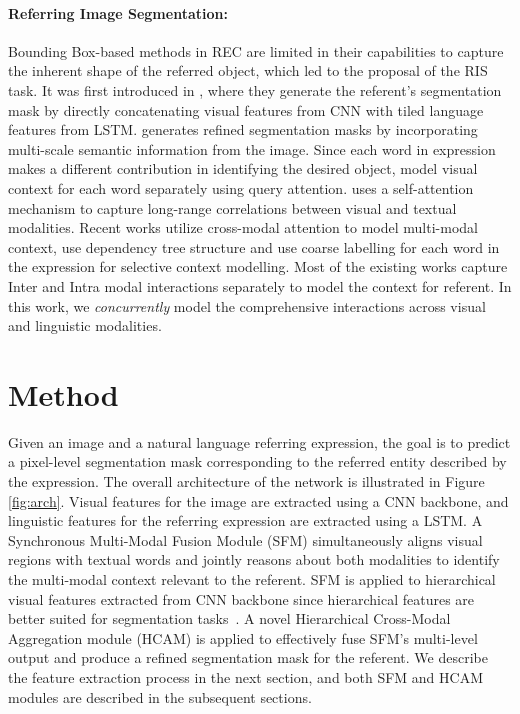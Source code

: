 \documentclass[11pt]{article}
\begin{document}
\paragraph{Referring Image Segmentation:} Bounding Box-based methods in REC are limited in their capabilities to capture the inherent shape of the referred object, which led to the proposal of the RIS task. It was first introduced in \cite{hu2016segmentation}, where they generate the referent's segmentation mask by directly concatenating visual features from CNN with tiled language features from LSTM. \cite{Li_2018_CVPR} generates refined segmentation masks by incorporating multi-scale semantic information from the image. Since each word in expression makes a different contribution in identifying the desired object, \cite{Shi_2018_ECCV} model visual context for each word separately using query attention. \cite{ye2019cross} uses a self-attention mechanism to capture long-range correlations between visual and textual modalities. Recent works \cite{Hu_2020_CVPR, Huang_2020_CVPR, hui2020linguistic} utilize cross-modal attention to model multi-modal context, \cite{hui2020linguistic, Yang_2021_CVPR} use dependency tree structure and \cite{Huang_2020_CVPR} use coarse labelling for each word in the expression for selective context modelling. Most of the existing works capture Inter and Intra modal interactions separately to model the context for referent. In this work, we \emph{concurrently} model the comprehensive interactions across visual and linguistic modalities.





\section{Method}
Given an image and a natural language referring expression, the goal is to predict a pixel-level segmentation mask corresponding to the referred entity described by the expression. The overall architecture of the network is illustrated in Figure \ref{fig:arch}. Visual features for the image are extracted using a CNN backbone, and linguistic features for the referring expression are extracted using a LSTM. A Synchronous Multi-Modal Fusion Module (SFM) simultaneously aligns visual regions with textual words and jointly reasons about both modalities to identify the multi-modal context relevant to the referent. SFM is applied to hierarchical visual features extracted from CNN backbone since hierarchical features are better suited for segmentation tasks~\cite{ye2019cross, Chen_2019_ICCV, Hu_2020_CVPR}. A novel Hierarchical Cross-Modal Aggregation module (HCAM) is applied to effectively fuse SFM's multi-level output and produce a refined segmentation mask for the referent. We describe the feature extraction process in the next section, and both SFM and HCAM modules are described in the subsequent sections.
\end{document}

